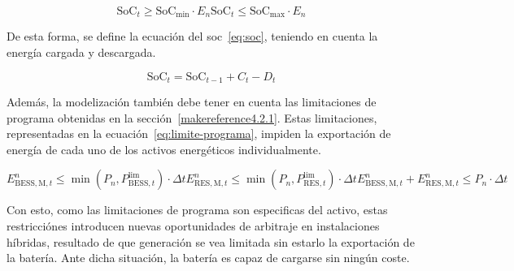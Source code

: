 \begin{subequations}%
  \label{eq:limite-soc}

  \begin{equation}
    \text{SoC}_{t} \ge \text{SoC}_{\text{min}} \cdot E_{n}
  \end{equation}

  \begin{equation}
    \text{SoC}_{t} \le \text{SoC}_{\text{max}} \cdot E_{n}
  \end{equation}

\end{subequations}

De esta forma, se define la ecuación del \gls{soc}~\ref{eq:soc}, teniendo en cuenta la energía cargada y descargada.

\begin{equation}%
  \label{eq:soc}
  \text{SoC}_{t} = \text{SoC}_{t - 1} + C_{t} - D_{t}
\end{equation}

Además, la modelización también debe tener en cuenta las limitaciones de programa obtenidas en la sección~\ref{makereference4.2.1}. Estas limitaciones, representadas en la ecuación~\ref{eq:limite-programa}, impiden la exportación de energía de cada uno de los activos energéticos individualmente.

\begin{subequations}%
  \label{eq:limite-programa}

  \begin{equation}
    E^{n}_{\text{BESS}, \text{M}, t} \le \min(P_{n}, P^{\text{lim}}_{\text{BESS}, t}) \cdot \Delta t
  \end{equation}

  \begin{equation}
    E^{n}_{\text{RES}, \text{M}, t} \le \min(P_{n}, P^{\text{lim}}_{\text{RES}, t}) \cdot \Delta t
  \end{equation}

  \begin{equation}
    E^{n}_{\text{BESS}, \text{M}, t} + E^{n}_{\text{RES}, \text{M}, t} \le P_{n} \cdot \Delta t
  \end{equation}

\end{subequations}

Con esto, como las limitaciones de programa son especificas del activo, estas restricciónes introducen nuevas oportunidades de arbitraje en instalaciones híbridas, resultado de que generación se vea limitada sin estarlo la exportación de la batería. Ante dicha situación, la batería es capaz de cargarse sin ningún coste.

